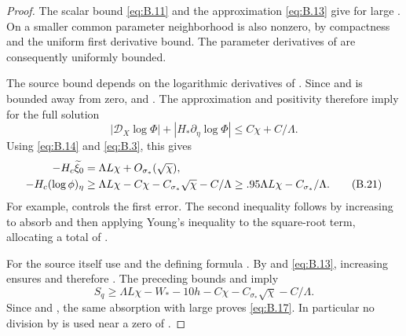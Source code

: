 \begin{proof}
The scalar bound \eqref{eq:B.11} and the approximation \eqref{eq:B.13} give
 for large . On a smaller
common parameter neighborhood  is also nonzero, by compactness and the
uniform first derivative bound. The parameter derivatives of  are
consequently uniformly bounded.

The source bound depends on the logarithmic derivatives of . Since
 and
 is bounded away from zero,
 and
. The approximation and positivity
therefore imply for the full solution
\begin{equation}
  |\mathcal D_X\log\Phi|+|H_*\partial_\eta\log\Phi|\leq C\chi+C/\Lambda.
  \tag{B.20}\label{eq:B.20}
\end{equation}
Using \eqref{eq:B.14} and \eqref{eq:B.3}, this gives
\begin{align}
  -H_c\widetilde\xi_0&=\Lambda L\chi+O_{\sigma_*}(\sqrt\chi),\notag\\
  -H_c(\log\phi)_\eta
    &\geq\Lambda L\chi-C\chi-C_{\sigma_*}\sqrt\chi-C/\Lambda
      \geq.95\Lambda L\chi-C_{\sigma_*}/\Lambda.
  \tag{B.21}\label{eq:B.21}
\end{align}
For example,
 controls the first
error. The second inequality follows by increasing  to absorb
 and then applying Young's inequality to the square-root term, allocating
a total of .

For the source itself use  and the defining formula
. By
 and \eqref{eq:B.13}, increasing
 ensures  and therefore
. The preceding bounds and
 imply
\begin{equation*}
  S_q\geq\Lambda L\chi-W_*-10h-C\chi-C_{\sigma_*}\sqrt\chi-C/\Lambda.
\end{equation*}
Since  and , the same absorption
with  large proves \eqref{eq:B.17}. In particular no division by
 is used near a zero of .


\end{proof}
